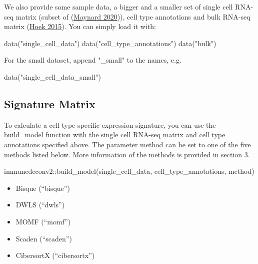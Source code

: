 \documentclass[
]{article}
\newenvironment{Shaded}{\begin{snugshade}}{\end{snugshade}}
\newcommand{\FunctionTok}[1]{\textcolor[rgb]{0.00,0.00,0.00}{#1}}
\newcommand{\NormalTok}[1]{#1}
\newcommand{\SpecialCharTok}[1]{\textcolor[rgb]{0.00,0.00,0.00}{#1}}
\newcommand{\StringTok}[1]{\textcolor[rgb]{0.31,0.60,0.02}{#1}}
\providecommand{\tightlist}{%
  \setlength{\itemsep}{0pt}\setlength{\parskip}{0pt}}
\begin{document}
We also provide some sample data, a bigger and a smaller set of single
cell RNA-seq matrix (subset of
(\protect\hyperlink{ref-Maynard2020}{Maynard 2020})), cell type
annotations and bulk RNA-seq matrix
(\protect\hyperlink{ref-Hoek2015}{Hoek 2015}). You can simply load it
with:

\begin{Shaded}
\begin{Highlighting}[]
\FunctionTok{data}\NormalTok{(}\StringTok{"single\_cell\_data"}\NormalTok{)}
\FunctionTok{data}\NormalTok{(}\StringTok{"cell\_type\_annotations"}\NormalTok{)}
\FunctionTok{data}\NormalTok{(}\StringTok{"bulk"}\NormalTok{)}
\end{Highlighting}
\end{Shaded}

For the small dataset, append "\_small" to the names, e.g.~

\begin{Shaded}
\begin{Highlighting}[]
\FunctionTok{data}\NormalTok{(}\StringTok{"single\_cell\_data\_small"}\NormalTok{)}
\end{Highlighting}
\end{Shaded}

\hypertarget{signature-matrix}{%
\subsection{Signature Matrix}\label{signature-matrix}}

To calculate a cell-type-specific expression signature, you can use the
build\_model function with the single cell RNA-seq matrix and cell type
annotations specified above. The parameter method can be set to one of
the five methods listed below. More information of the methods is
provided in section 3.

\begin{Shaded}
\begin{Highlighting}[]
\NormalTok{immunedeconv2}\SpecialCharTok{::}\FunctionTok{build\_model}\NormalTok{(single\_cell\_data, cell\_type\_annotations, }
\NormalTok{    method)}
\end{Highlighting}
\end{Shaded}

\begin{itemize}
\tightlist
\item
  Bisque (``bisque'')
\item
  DWLS (``dwls'')
\item
  MOMF (``momf'')
\item
  Scaden (``scaden'')
\item
  CibersortX (``cibersortx'')
\end{itemize}
\end{document}

